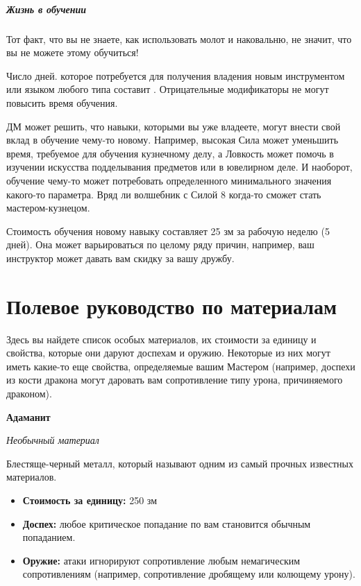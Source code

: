 \documentclass[a4paper, 9pt, twocolumn]{book}
\begin{document}
	\paragraph*{Жизнь в обучении}
	
	Тот факт, что вы не знаете, как использовать молот и наковальню, не значит, что вы не можете этому обучиться!
	
	Число дней. которое потребуется для получения владения новым инструментом или языком любого типа составит . Отрицательные модификаторы не могут повысить время обучения.
	
	ДМ может решить, что навыки, которыми вы уже владеете, могут внести свой вклад в обучение чему-то новому. Например, высокая Сила может уменьшить время, требуемое для обучения кузнечному делу, а Ловкость может помочь в изучении искусства подделывания предметов или в ювелирном деле. И наоборот, обучение чему-то может потребовать определенного минимального значения какого-то параметра. Вряд ли волшебник с Силой 8 когда-то сможет стать мастером-кузнецом.
	
	Стоимость обучения новому навыку составляет 25 зм за рабочую неделю (5 дней). Она может варьироваться по целому ряду причин, например, ваш инструктор может давать вам скидку за вашу дружбу.
	
	\chapter{Полевое руководство по материалам}
	
	Здесь вы найдете список особых материалов, их стоимости за единицу и свойства, которые они даруют доспехам и оружию. Некоторые из них могут иметь какие-то еще свойства, определяемые вашим Мастером (например, доспехи из кости дракона могут даровать вам сопротивление типу урона, причиняемого драконом).
	
	\bigskip
	
	\noindent\textbf{Адаманит}
	
	\noindent \textit{Необычный материал}
	
	\smallskip
	
	\noindent Блестяще-черный металл, который называют одним из самый прочных известных материалов.
	
	\begin{itemize}
		\item \textbf{Стоимость за единицу:} 250 зм
		
		\item \textbf{Доспех:} любое критическое попадание по вам становится обычным попаданием.
		
		\item \textbf{Оружие:} атаки игнорируют сопротивление любым немагическим сопротивлениям (например, сопротивление дробящему или колющему урону).
	\end{itemize}
\end{document}
